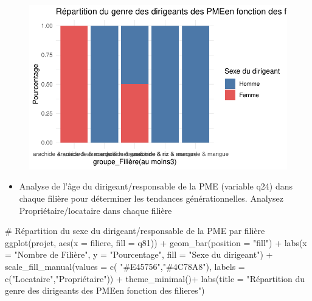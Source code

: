 \documentclass[
  letterpaper,
  DIV=11,
  numbers=noendperiod]{scrartcl}
\newenvironment{Shaded}{\begin{snugshade}}{\end{snugshade}}
\newcommand{\AttributeTok}[1]{\textcolor[rgb]{0.40,0.45,0.13}{#1}}
\newcommand{\CommentTok}[1]{\textcolor[rgb]{0.37,0.37,0.37}{#1}}
\newcommand{\FunctionTok}[1]{\textcolor[rgb]{0.28,0.35,0.67}{#1}}
\newcommand{\NormalTok}[1]{\textcolor[rgb]{0.00,0.23,0.31}{#1}}
\newcommand{\SpecialCharTok}[1]{\textcolor[rgb]{0.37,0.37,0.37}{#1}}
\newcommand{\StringTok}[1]{\textcolor[rgb]{0.13,0.47,0.30}{#1}}
\providecommand{\tightlist}{%
  \setlength{\itemsep}{0pt}\setlength{\parskip}{0pt}}\usepackage{longtable,booktabs,array}
\begin{document}
\begin{figure}[H]

{\centering \includegraphics{projet_R_files/figure-pdf/unnamed-chunk-34-1.pdf}

}

\end{figure}

\begin{itemize}
\tightlist
\item
  Analyse de l'âge du dirigeant/responsable de la PME (variable q24)
  dans chaque filière pour déterminer les tendances générationnelles.
  Analysez Propriétaire/locataire dans chaque filière
\end{itemize}

\begin{Shaded}
\begin{Highlighting}[]
\CommentTok{\# Répartition du sexe du dirigeant/responsable de la PME par filière}
\FunctionTok{ggplot}\NormalTok{(projet, }\FunctionTok{aes}\NormalTok{(}\AttributeTok{x =}\NormalTok{ filiere, }\AttributeTok{fill =}\NormalTok{ q81)) }\SpecialCharTok{+}
  \FunctionTok{geom\_bar}\NormalTok{(}\AttributeTok{position =} \StringTok{"fill"}\NormalTok{) }\SpecialCharTok{+}
  \FunctionTok{labs}\NormalTok{(}\AttributeTok{x =} \StringTok{"Nombre de  Filière"}\NormalTok{, }\AttributeTok{y =} \StringTok{"Pourcentage"}\NormalTok{, }\AttributeTok{fill =} \StringTok{"Sexe du dirigeant"}\NormalTok{) }\SpecialCharTok{+}
  \FunctionTok{scale\_fill\_manual}\NormalTok{(}\AttributeTok{values =} \FunctionTok{c}\NormalTok{( }\StringTok{"\#E45756"}\NormalTok{,}\StringTok{"\#4C78A8"}\NormalTok{), }\AttributeTok{labels =} \FunctionTok{c}\NormalTok{(}\StringTok{"Locataire"}\NormalTok{,}\StringTok{"Propriétaire"}\NormalTok{)) }\SpecialCharTok{+}
  \FunctionTok{theme\_minimal}\NormalTok{()}\SpecialCharTok{+}
  \FunctionTok{labs}\NormalTok{(}\AttributeTok{title =} \StringTok{"Répartition du genre des dirigeants des PMEen fonction des filieres"}\NormalTok{)}
\end{Highlighting}
\end{Shaded}
\end{document}
